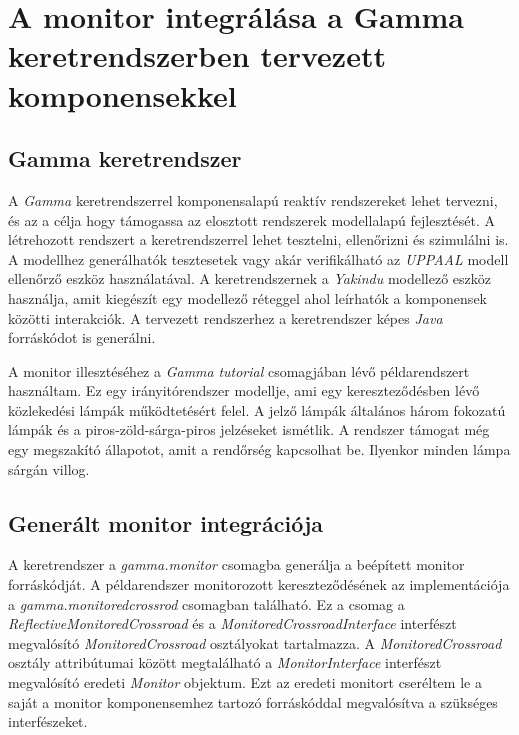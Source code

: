 \chapter{A monitor integrálása a Gamma keretrendszerben tervezett komponensekkel}

\section{Gamma keretrendszer}

A \textit{Gamma} keretrendszerrel komponensalapú reaktív rendszereket lehet tervezni, és az a célja hogy támogassa az elosztott rendszerek modellalapú fejlesztését.
A létrehozott rendszert a keretrendszerrel lehet tesztelni, ellenőrizni és szimulálni is.
A modellhez generálhatók tesztesetek vagy akár verifikálható az \textit{UPPAAL} modell ellenőrző eszköz használatával.
A keretrendszernek a \textit{Yakindu} modellező eszköz használja, amit kiegészít egy modellező réteggel ahol leírhatók a komponensek közötti interakciók.
A tervezett rendszerhez a keretrendszer képes \textit{Java} forráskódot is generálni.

A monitor illesztéséhez a \textit{Gamma} \textit{tutorial} csomagjában lévő példarendszert használtam.
Ez egy irányitórendszer modellje, ami egy kereszteződésben lévő közlekedési lámpák működtetésért felel.
A jelző lámpák általános három fokozatú lámpák és a piros-zöld-sárga-piros jelzéseket ismétlik.
A rendszer támogat még egy megszakító állapotot, amit a rendőrség kapcsolhat be.
Ilyenkor minden lámpa sárgán villog.

\clearpage\section{Generált monitor integrációja}

A keretrendszer a \textit{gamma.monitor} csomagba generálja a beépített monitor forráskódját.
A példarendszer monitorozott kereszteződésének az implementációja a \textit{gamma.monitoredcrossrod} csomagban található.
Ez a csomag a \textit{ReflectiveMonitoredCrossroad} és a \textit{MonitoredCrossroadInterface} interfészt megvalósító \textit{MonitoredCrossroad} osztályokat tartalmazza.
A \textit{MonitoredCrossroad} osztály attribútumai között megtalálható a \textit{MonitorInterface} interfészt megvalósító eredeti \textit{Monitor} objektum.
Ezt az eredeti monitort cseréltem le a saját a monitor komponensemhez tartozó forráskóddal megvalósítva a szükséges interfészeket.

